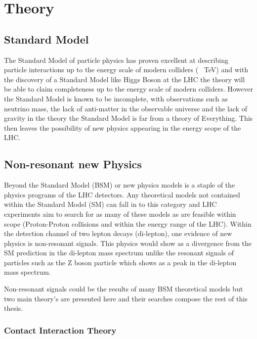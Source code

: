 \chapter{Theory}


\section{Standard Model}
    
    The Standard Model of particle physics has proven excellent at describing particle interactions up to the energy scale of modern colliders (~ TeV) and with the discovery of a Standard Model like Higgs Boson at the LHC the theory will be able to claim completeness up to the energy scale of modern colliders. However the Standard Model is known to be incomplete, with observations such as neutrino mass, the lack of anti-matter in the observable universe and the lack of gravity in the theory the Standard Model is far from a theory of Everything. This then leaves the possibility of new physics appearing in the energy scope of the LHC.



\section{Non-resonant new Physics}

    Beyond the Standard Model (BSM) or new physics models is a staple of the physics programs of the LHC detectors. Any theoretical models not contained within the Standard Model (SM) can fall in to this category and LHC experiments aim to search for as many of these models as are feasible within scope (Proton-Proton collisions and within the energy range of the LHC). Within the detection channel of two lepton decays (di-lepton), one evidence of new physics is non-resonant signals. This physics would show as a divergence from the SM prediction in the di-lepton mass spectrum unlike the resonant signals of particles such as the Z boson particle which shows as a peak in the di-lepton mass spectrum.

    Non-resonant signals could be the results of many BSM theoretical models but two main theory’s are presented here and their searches compose the rest of this thesis.\cite{Eichten:1983hw}


    \subsection{Contact Interaction Theory}

